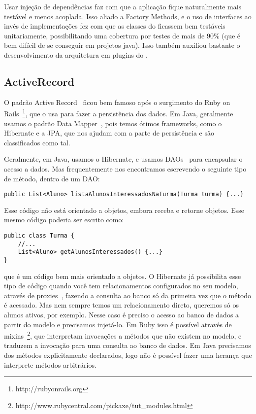 Usar injeção de dependências faz com que a aplicação fique naturalmente mais testável e menos acoplada. Isso aliado a
Factory Methods\cite{gof}, e o uso de interfaces ao invés de implementações \cite{effective} fez com que as
classes do \calopsita ficassem bem testáveis unitariamente, possibilitando uma cobertura por testes de mais de 
90\% (que é bem difícil de se conseguir em projetos java). Isso também auxiliou bastante
o desenvolvimento da arquitetura em plugins do \calopsita.

\subsection{ActiveRecord}

O padrão Active Record~\cite{fowler} ficou bem famoso após o surgimento do Ruby on 
Rails~\footnote{http://rubyonrails.org}, que o usa 
para fazer a persistência dos dados. Em Java, geralmente usamos o padrão Data Mapper~\cite{fowler}, pois temos 
ótimos frameworks, como o Hibernate e a JPA, que nos ajudam com a parte de persistência e são classificados como tal.

Geralmente, em Java, usamos o Hibernate, e usamos DAOs~\cite{dao} para encapsular 
o acesso a dados. Mas frequentemente nos encontramos escrevendo o seguinte tipo de método, dentro de um DAO:

\begin{lstlisting}
public List<Aluno> listaAlunosInteressadosNaTurma(Turma turma) {...}
\end{lstlisting}

Esse código não está orientado a objetos, embora receba e retorne objetos. Esse mesmo código poderia ser escrito como:

\begin{lstlisting}
public class Turma {
	//...
	List<Aluno> getAlunosInteressados() {...}
}
\end{lstlisting}

que é um código bem mais orientado a objetos. O Hibernate já possibilita esse tipo de código quando você
tem relacionamentos configurados no seu modelo, através de proxies~\cite{gof}, fazendo a consulta ao banco
só da primeira vez que o método é acessado. Mas nem sempre temos um relacionamento direto, queremos só os alunos
ativos, por exemplo. Nesse caso é preciso o acesso ao banco de dados a partir do modelo e precisamos injetá-lo.
Em Ruby isso é possível através de mixins~\footnote{http://www.rubycentral.com/pickaxe/tut\_modules.html}, que 
interpretam invocações a métodos que não existem no modelo, e traduzem a invocação para uma consulta ao banco 
de dados. Em Java precisamos dos métodos explicitamente declarados, logo não é possível fazer uma herança que 
interprete métodos arbitrários.

